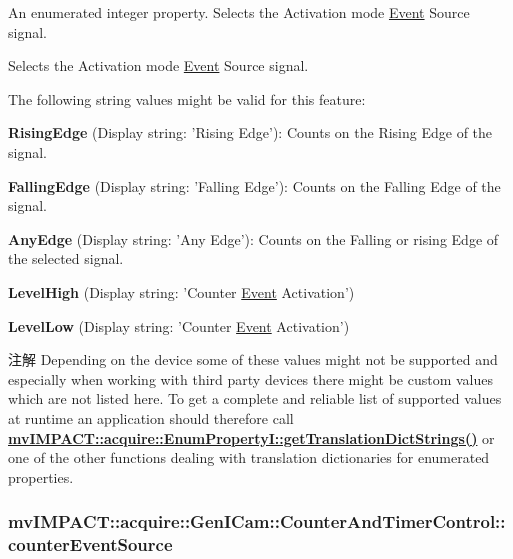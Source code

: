 An enumerated integer property. Selects the Activation mode \hyperlink{classmv_i_m_p_a_c_t_1_1acquire_1_1_event}{Event} Source signal. 

Selects the Activation mode \hyperlink{classmv_i_m_p_a_c_t_1_1acquire_1_1_event}{Event} Source signal.

The following string values might be valid for this feature\+:
\begin{DoxyItemize}
\item {\bfseries Rising\+Edge} (Display string\+: 'Rising Edge')\+: Counts on the Rising Edge of the signal.
\item {\bfseries Falling\+Edge} (Display string\+: 'Falling Edge')\+: Counts on the Falling Edge of the signal.
\item {\bfseries Any\+Edge} (Display string\+: 'Any Edge')\+: Counts on the Falling or rising Edge of the selected signal.
\item {\bfseries Level\+High} (Display string\+: 'Counter \hyperlink{classmv_i_m_p_a_c_t_1_1acquire_1_1_event}{Event} Activation')
\item {\bfseries Level\+Low} (Display string\+: 'Counter \hyperlink{classmv_i_m_p_a_c_t_1_1acquire_1_1_event}{Event} Activation')
\end{DoxyItemize}

\begin{DoxyNote}{注解}
Depending on the device some of these values might not be supported and especially when working with third party devices there might be custom values which are not listed here. To get a complete and reliable list of supported values at runtime an application should therefore call {\bfseries \hyperlink{classmv_i_m_p_a_c_t_1_1acquire_1_1_enum_property_i_a0ba6ccbf5ee69784d5d0b537924d26b6}{mv\+I\+M\+P\+A\+C\+T\+::acquire\+::\+Enum\+Property\+I\+::get\+Translation\+Dict\+Strings()}} or one of the other functions dealing with translation dictionaries for enumerated properties. 
\end{DoxyNote}
\hypertarget{classmv_i_m_p_a_c_t_1_1acquire_1_1_gen_i_cam_1_1_counter_and_timer_control_a449221a170934fd17e3c3253f935074a}{
\subsubsection[{counter\+Event\+Source}]{ mv\+I\+M\+P\+A\+C\+T\+::acquire\+::\+Gen\+I\+Cam\+::\+Counter\+And\+Timer\+Control\+::counter\+Event\+Source}}\label{classmv_i_m_p_a_c_t_1_1acquire_1_1_gen_i_cam_1_1_counter_and_timer_control_a449221a170934fd17e3c3253f935074a}


